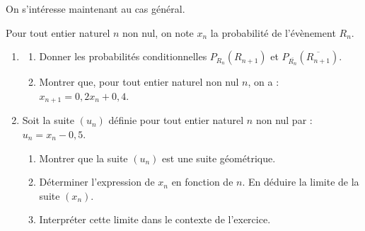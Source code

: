 \documentclass[10pt]{article}
\begin{document}
On s'intéresse maintenant au cas général.

Pour tout entier naturel $n$ non nul, on note $x_{n}$ la probabilité de l'évènement $R_{n}$.

\begin{enumerate}
	\item \begin{enumerate}
		\item Donner les probabilités conditionnelles $P_{R_{n}}\left(R_{n + 1}\right)$ et $P_{\overline{R_{n}}}\left(\overline{R_{n + 1}}\right)$.

		\item Montrer que, pour tout entier naturel non nul $n$, on a : $x_{n + 1}=0,2 x_{n} + 0,4$.
	\end{enumerate}

	\item Soit la suite $\left(u_{n}\right)$ définie pour tout entier naturel $n$ non nul par :\quad $u_{n}=x_{n}-0,5$.

	\begin{enumerate}
		\item Montrer que la suite $\left(u_{n}\right)$ est une suite géométrique.
		\item Déterminer l'expression de $x_{n}$ en fonction de $n$. En déduire la limite de la suite $\left(x_{n}\right)$.
		\item Interpréter cette limite dans le contexte de l'exercice.
	\end{enumerate}
\end{enumerate}
\end{document}
